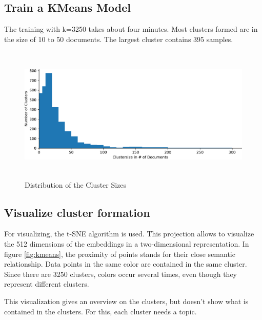\subsection{Train a KMeans Model}

The training with k=3250 takes about four minutes. Most clusters formed are in the size of 10 to 50 documents. The largest cluster contains 395 samples.

\begin{figure}[!h]
	\centering
	\includegraphics[height=6.5cm]{Bilder/models/clustersize.pdf}
	\caption{Distribution of the Cluster Sizes}
	\label{fig:clustersize}
\end{figure}

\subsection{Visualize cluster formation}
For visualizing, the \ac{t-SNE} algorithm is used. This projection allows to visualize the 512 dimensions of the embeddings in a two-dimensional representation. In figure \ref{fig:kmeans}, the proximity of points stands for their close semantic relationship. Data points in the same color are contained in the same cluster. Since there are 3250 clusters, colors occur several times, even though they represent different clusters.

This visualization gives an overview on the clusters, but doesn't show what is contained in the clusters. For this, each cluster needs a topic.

